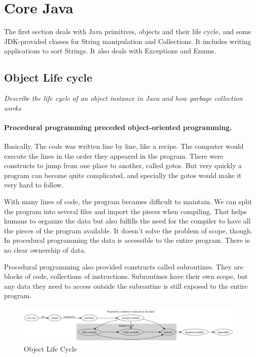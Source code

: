 \section{Core Java}

The first section deals with Java primitives, objects and their life cycle, and some JDK-provided classes for String manipulation and Collections. It includes writing applications to sort Strings. It also deals with Exceptions and Enums.

\subsection{Object Life cycle}
\begin{center}\textit{Describe the life cycle of an object instance in Java and how garbage collection works}\end{center}

\paragraph{Procedural programming preceded object-oriented programming.} Basically, The code was written line by line, like a recipe. The computer would execute the lines in the order they appeared in the program. There were constructs to jump from one place to another, called gotos. But very quickly a program can become quite complicated, and specially the gotos would make it very hard to follow. 

With many lines of code, the program becames difficult to maintain. We can split the program into several files and import the pieces when compiling. That helps humans to organize the data but also fulfills the need for the compiler to have all the pieces of the program available. It doesn't solve the problem of scope, though. In procedural programming the data is accessible to the entire program. There is no clear ownership of data.

Procedural programming also provided constructs called subroutines. They are blocks of code, collections of instructions. Subroutines have their own scope, but any data they need to access outside the subroutine is still exposed to the entire program.

\begin{figure}[ht]\centering %
\includegraphics[width=\linewidth]{object-life-cycle}
\caption{Object Life Cycle}
\label{fig:object-life-cycle}
\end{figure}

